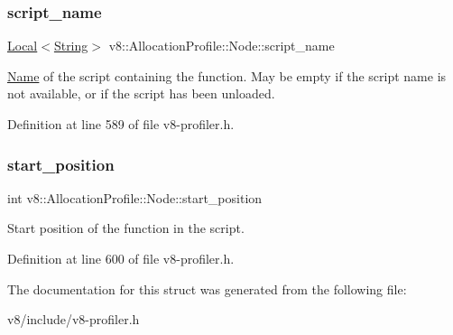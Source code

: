 \subsubsection{\texorpdfstring{script\+\_\+name}{script\_name}}
{\footnotesize\ttfamily \mbox{\hyperlink{classv8_1_1Local}{Local}}$<$\mbox{\hyperlink{classv8_1_1String}{String}}$>$ v8\+::\+Allocation\+Profile\+::\+Node\+::script\+\_\+name}

\mbox{\hyperlink{classv8_1_1Name}{Name}} of the script containing the function. May be empty if the script name is not available, or if the script has been unloaded. 

Definition at line 589 of file v8-\/profiler.\+h.

\mbox{\label{structv8_1_1AllocationProfile_1_1Node_a6caceefbf826a0425adc74331cc7a910}} 
\subsubsection{\texorpdfstring{start\+\_\+position}{start\_position}}
{\footnotesize\ttfamily int v8\+::\+Allocation\+Profile\+::\+Node\+::start\+\_\+position}

Start position of the function in the script. 

Definition at line 600 of file v8-\/profiler.\+h.



The documentation for this struct was generated from the following file\+:\begin{DoxyCompactItemize}
\item 
v8/include/v8-\/profiler.\+h\end{DoxyCompactItemize}
